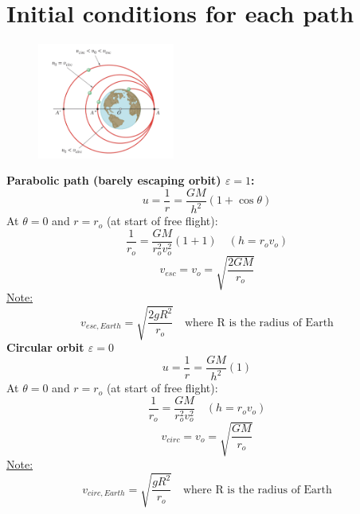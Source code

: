 \documentclass[10pt, fleqn]{article}
\begin{document}
\section*{Initial conditions for each path}
\begin{figure}[H]
    \centering
    \includegraphics[width=0.4\textwidth]{conditions.png}
\end{figure}
\textbf{Parabolic path (barely escaping orbit) $\varepsilon =1$:}
\[u = \frac{1}{r} = \frac{GM}{h^2}(1 + \cos\theta)\]
At $\theta=0$ and $r=r_o$ (at start of free flight):
\[\frac{1}{r_o} = \frac{GM}{r_o^2v_o^2}(1 + 1) \quad (h=r_ov_o)\]
\[v_{esc}=v_o=\sqrt{\frac{2GM}{r_o}}\]
\underline{Note:}
\[v_{esc,Earth}=\sqrt{\frac{2gR^2}{r_o}} \quad \text{where R is the radius of Earth}\]
\textbf{Circular orbit $\varepsilon=0$}
\[u = \frac{1}{r} = \frac{GM}{h^2}(1) \]
At $\theta=0$ and $r=r_o$ (at start of free flight):
\[\frac{1}{r_o}=\frac{GM}{r_o^2v_o^2} \quad (h=r_ov_o)\]
\[v_{circ}=v_o=\sqrt{\frac{GM}{r_o}}\]
\underline{Note:}
\[v_{circ,Earth}=\sqrt{\frac{gR^2}{r_o}} \quad \text{where R is the radius of Earth}\]
\end{document}
